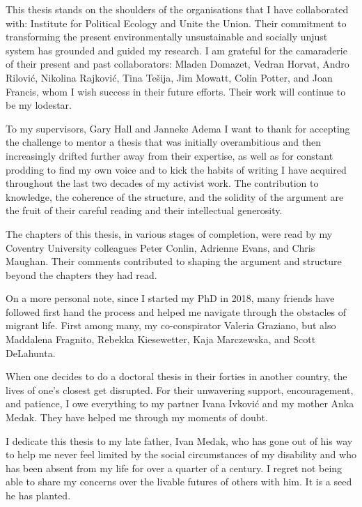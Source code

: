 \documentclass[a4paper, nobind]{templates/ociamthesis}
\begin{document}
\begin{romanpages}
\begin{acknowledgements}
  This thesis stands on the shoulders of the organisations that I have collaborated with: Institute for Political Ecology and Unite the Union. Their commitment to transforming the present environmentally unsustainable and socially unjust system has grounded and guided my research. I am grateful for the camaraderie of their present and past collaborators: Mladen Domazet, Vedran Horvat, Andro Rilović, Nikolina Rajković, Tina Tešija, Jim Mowatt, Colin Potter, and Joan Francis, whom I wish success in their future efforts. Their work will continue to be my lodestar.

  To my supervisors, Gary Hall and Janneke Adema I want to thank for accepting the challenge to mentor a thesis that was initially overambitious and then increasingly drifted further away from their expertise, as well as for constant prodding to find my own voice and to kick the habits of writing I have acquired throughout the last two decades of my activist work. The contribution to knowledge, the coherence of the structure, and the solidity of the argument are the fruit of their careful reading and their intellectual generosity.

  The chapters of this thesis, in various stages of completion, were read by my Coventry University colleagues Peter Conlin, Adrienne Evans, and Chris Maughan. Their comments contributed to shaping the argument and structure beyond the chapters they had read.

  On a more personal note, since I started my PhD in 2018, many friends have followed first hand the process and helped me navigate through the obstacles of migrant life. First among many, my co-conspirator Valeria Graziano, but also Maddalena Fragnito, Rebekka Kiesewetter, Kaja Marczewska, and Scott DeLahunta.

  When one decides to do a doctoral thesis in their forties in another country, the lives of one's closest get disrupted. For their unwavering support, encouragement, and patience, I owe everything to my partner Ivana Ivković and my mother Anka Medak. They have helped me through my moments of doubt.

  I dedicate this thesis to my late father, Ivan Medak, who has gone out of his way to help me never feel limited by the social circumstances of my disability and who has been absent from my life for over a quarter of a century. I regret not being able to share my concerns over the livable futures of others with him. It is a seed he has planted.

  \pagebreak


\end{acknowledgements}
\end{romanpages}
\end{document}

